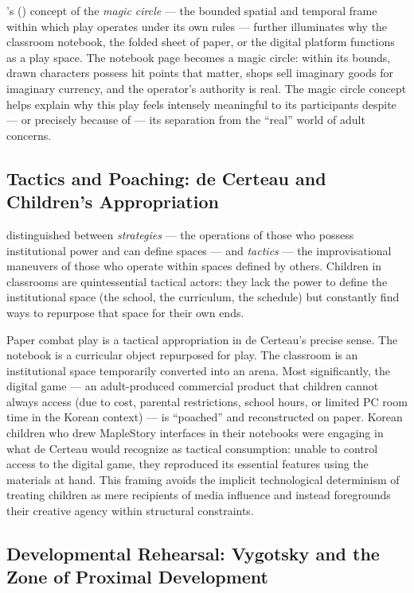 \documentclass[12pt]{article}
\begin{document}
\citeauthor{huizinga1938}'s (\citeyear{huizinga1938}) concept of the \emph{magic circle} --- the bounded spatial and temporal frame within which play operates under its own rules --- further illuminates why the classroom notebook, the folded sheet of paper, or the digital platform functions as a play space. The notebook page becomes a magic circle: within its bounds, drawn characters possess hit points that matter, shops sell imaginary goods for imaginary currency, and the operator's authority is real. The magic circle concept helps explain why this play feels intensely meaningful to its participants despite --- or precisely because of --- its separation from the ``real'' world of adult concerns.

\subsection{Tactics and Poaching: de Certeau and Children's Appropriation}

\citet{decerteau1984} distinguished between \emph{strategies} --- the operations of those who possess institutional power and can define spaces --- and \emph{tactics} --- the improvisational maneuvers of those who operate within spaces defined by others. Children in classrooms are quintessential tactical actors: they lack the power to define the institutional space (the school, the curriculum, the schedule) but constantly find ways to repurpose that space for their own ends.

Paper combat play is a tactical appropriation in de Certeau's precise sense. The notebook is a curricular object repurposed for play. The classroom is an institutional space temporarily converted into an arena. Most significantly, the digital game --- an adult-produced commercial product that children cannot always access (due to cost, parental restrictions, school hours, or limited PC room time in the Korean context) --- is ``poached'' and reconstructed on paper. Korean children who drew MapleStory interfaces in their notebooks were engaging in what de Certeau would recognize as tactical consumption: unable to control access to the digital game, they reproduced its essential features using the materials at hand. This framing avoids the implicit technological determinism of treating children as mere recipients of media influence and instead foregrounds their creative agency within structural constraints.

\subsection{Developmental Rehearsal: Vygotsky and the Zone of Proximal Development}
\end{document}
